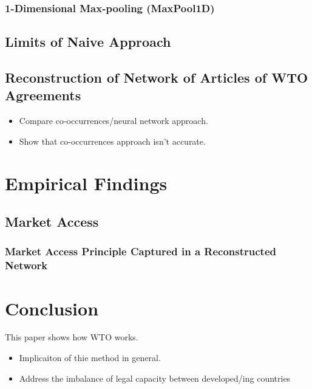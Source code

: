 \documentclass[12pt,letterpaper]{article}
\begin{document}
\subsubsection{1-Dimensional Max-pooling (MaxPool1D)}


% 




\subsection{Limits of Naive Approach}

\subsection{Reconstruction of Network of Articles of WTO Agreements}


\begin{itemize}
  \item Compare co-occurrences/neural network approach.

  \item Show that co-occurrences approach isn't accurate.
\end{itemize}


\section{Empirical Findings}


\subsection{Market Access}


\subsubsection{Market Access Principle Captured in a Reconstructed Network}


\section{Conclusion}
This paper shows how WTO works.

\begin{itemize}
  \item Implicaiton of thie method in general.
  \item Address the imbalance of legal capacity between developed/ing countries
\end{itemize}
\end{document}
